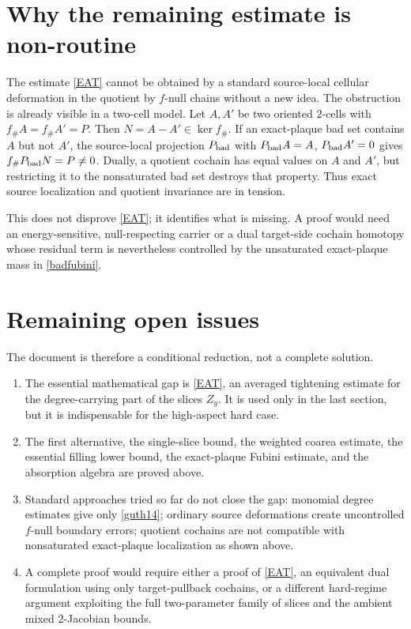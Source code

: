 \documentclass[12pt]{article}
\begin{document}
\section*{Why the remaining estimate is non-routine}

The estimate \eqref{EAT} cannot be obtained by a standard source-local
cellular deformation in the quotient by \(f\)-null chains without a new idea.
The obstruction is already visible in a two-cell model.  Let \(A,A'\) be two
oriented \(2\)-cells with \(f_\#A=f_\#A'=P\).  Then \(N=A-A'\in\ker f_\#\).
If an exact-plaque bad set contains \(A\) but not \(A'\), the source-local
projection \(P_{\rm bad}\) with \(P_{\rm bad}A=A\), \(P_{\rm bad}A'=0\) gives
\(f_\#P_{\rm bad}N=P\ne0\).  Dually, a quotient cochain has equal values on
\(A\) and \(A'\), but restricting it to the nonsaturated bad set destroys that
property.  Thus exact source localization and quotient invariance are in
tension.

This does not disprove \eqref{EAT}; it identifies what is missing.  A proof
would need an energy-sensitive, null-respecting carrier or a dual target-side
cochain homotopy whose residual term is nevertheless controlled by the
unsaturated exact-plaque mass in \eqref{badfubini}.

\section*{Remaining open issues}

The document is therefore a conditional reduction, not a complete solution.

\begin{enumerate}
\item The essential mathematical gap is \eqref{EAT}, an averaged tightening
estimate for the degree-carrying part of the slices \(Z_y\).  It is used only
in the last section, but it is indispensable for the high-aspect hard case.

\item The first alternative, the single-slice bound, the weighted coarea
estimate, the essential filling lower bound, the exact-plaque Fubini estimate,
and the absorption algebra are proved above.

\item Standard approaches tried so far do not close the gap: monomial
degree estimates give only \eqref{guth14}; ordinary source deformations create
uncontrolled \(f\)-null boundary errors; quotient cochains are not compatible
with nonsaturated exact-plaque localization as shown above.

\item A complete proof would require either a proof of \eqref{EAT}, an
equivalent dual formulation using only target-pullback cochains, or a different
hard-regime argument exploiting the full two-parameter family of slices and the
ambient mixed \(2\)-Jacobian bounds.
\end{enumerate}
\end{document}
